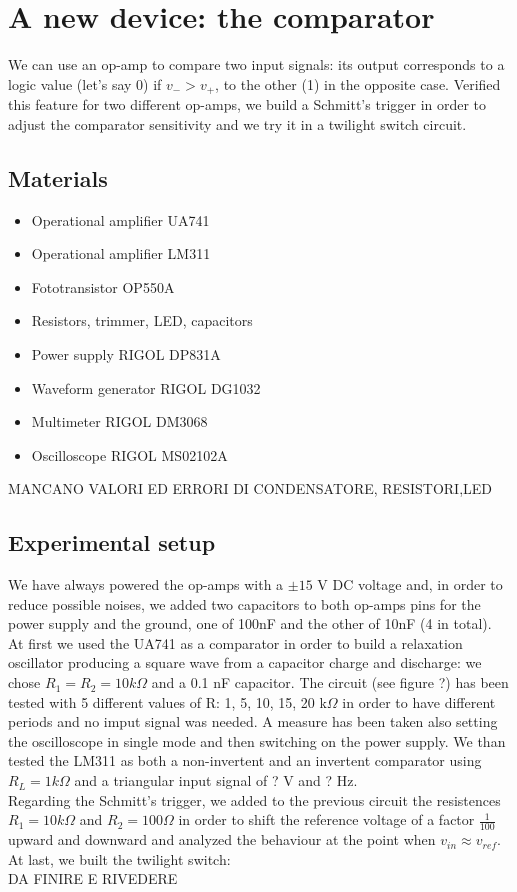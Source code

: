 \chapter{A new device: the comparator}
We can use an op-amp to compare two input signals: its output corresponds to a logic value (let's say 0) if $v_- > v_+$, to the other (1) in the opposite case. Verified this feature for two different op-amps, we build a Schmitt's trigger in order to adjust the comparator sensitivity and we try it in a twilight switch circuit.

\section{Materials}
\begin{itemize}
\item Operational amplifier UA741
\item Operational amplifier LM311
\item Fototransistor OP550A
\item Resistors, trimmer, LED, capacitors
\item Power supply RIGOL DP831A
\item Waveform generator RIGOL DG1032
\item Multimeter RIGOL DM3068
\item Oscilloscope RIGOL MS02102A
\end{itemize}
MANCANO VALORI ED ERRORI DI CONDENSATORE, RESISTORI,LED

\section{Experimental setup}
We have always powered the op-amps with a $\pm15$ V DC voltage and, in order to reduce possible noises, we added two capacitors to both op-amps pins for the power supply and the ground, one of 100nF and the other of 10nF (4 in total).\\
At first we used the UA741 as a comparator in order to build a relaxation oscillator producing a square wave from a capacitor charge and discharge: we chose $R_1 = R_2 = 10k\Omega$ and a 0.1 nF capacitor. The circuit (see figure ?) has been tested with 5 different values of R: 1, 5, 10, 15, 20 k$\Omega$ in order to have different periods and no imput signal was needed. A measure has been taken also setting the oscilloscope in single mode and then switching on the power supply.
We than tested the LM311 as both a non-invertent and an invertent comparator using $R_L = 1k\Omega$ and a triangular input signal of ? V and ? Hz.\\
Regarding the Schmitt's trigger, we added to the previous circuit the resistences $R_1 = 10 k\Omega$ and $R_2 = 100 \Omega$ in order to shift the reference voltage of a factor $\frac{1}{100}$ upward and downward and analyzed the behaviour at the point when $v_{in}\approx v_{ref}$.\\
At last, we built the twilight switch:\\
DA FINIRE E RIVEDERE

